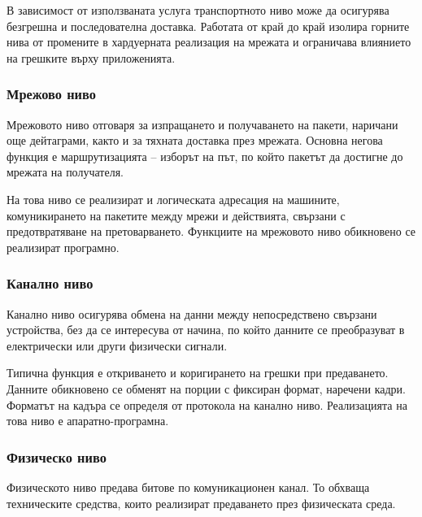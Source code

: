 В зависимост от използваната услуга транспортното ниво може да осигурява безгрешна и последователна доставка. Работата от край до край изолира горните нива от промените в хардуерната реализация на мрежата и ограничава влиянието на грешките върху приложенията.

\subsubsection{Мрежово ниво}

\begin{defn}
Мрежовото ниво отговаря за изпращането и получаването на пакети, наричани още дейтаграми, както и за тяхната доставка през мрежата. Основна негова функция е маршрутизацията -- изборът на път, по който пакетът да достигне до мрежата на получателя.
\end{defn}

На това ниво се реализират и логическата адресация на машините, комуникирането на пакетите между мрежи и действията, свързани с предотвратяване на претоварването. Функциите на мрежовото ниво обикновено се реализират програмно.

\subsubsection{Канално ниво}

\begin{defn}
Канално ниво осигурява обмена на данни между непосредствено свързани устройства, без да се интересува от начина, по който данните се преобразуват в електрически или други физически сигнали.
\end{defn}

Типична функция е откриването и коригирането на грешки при предаването. Данните обикновено се обменят на порции с фиксиран формат, наречени кадри. Форматът на кадъра се определя от протокола на канално ниво. Реализацията на това ниво е апаратно-програмна.

\subsubsection{Физическо ниво}

\begin{defn}
Физическото ниво предава битове по комуникационен канал. То обхваща техническите средства, които реализират предаването през физическата среда.
\end{defn}

